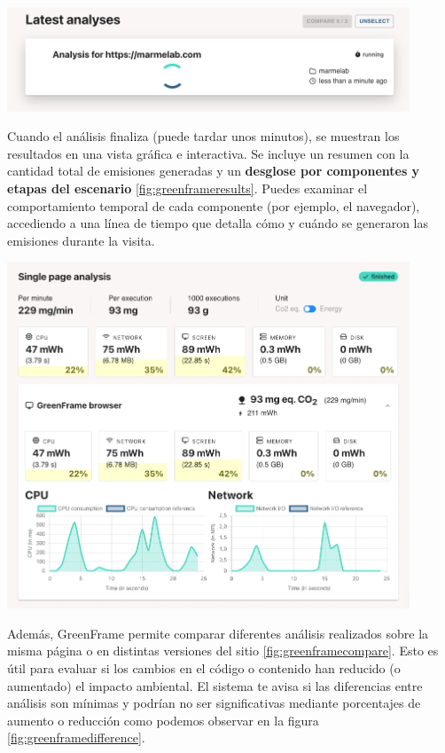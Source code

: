 \documentclass[12pt,a4paper]{report}
\begin{document}
\begin{center}
  \includegraphics[width=0.9\textwidth]{imagenes/Greenframe_4.png}
  \label{fig:greenframeurl}
\end{center}

Cuando el análisis finaliza (puede tardar unos minutos), se muestran los
resultados en una vista gráfica e interactiva. Se incluye un resumen con la
cantidad total de emisiones generadas y un \textbf{desglose por componentes y
  etapas del escenario} \ref{fig:greenframeresults}. Puedes examinar el comportamiento temporal de cada
componente (por ejemplo, el navegador), accediendo a una línea de tiempo que
detalla cómo y cuándo se generaron las emisiones durante la visita.

\begin{center}
  \includegraphics[width=0.9\textwidth]{imagenes/Greenframe_6.png}
  \label{fig:greenframeresults}
\end{center}

Además, GreenFrame permite comparar diferentes análisis realizados sobre la
misma página o en distintas versiones del sitio \ref{fig:greenframecompare}. Esto es útil para evaluar si
los cambios en el código o contenido han reducido (o aumentado) el impacto
ambiental. El sistema te avisa si las diferencias entre análisis son mínimas y
podrían no ser significativas mediante porcentajes de aumento o reducción como podemos observar en la figura \ref{fig:greenframedifference}.
\end{document}
